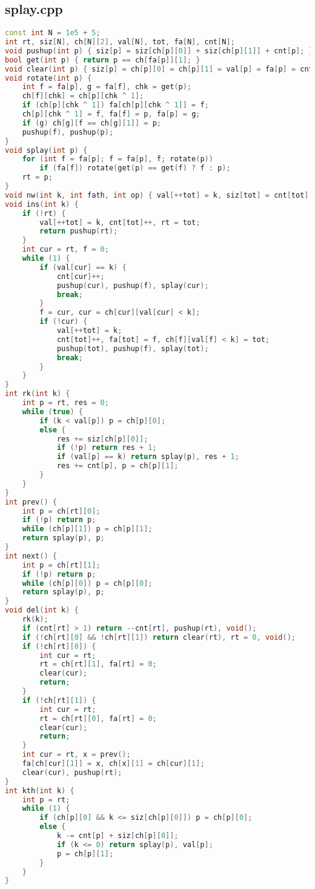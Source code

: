 \documentclass[9pt, a4paper, oneside]{book}
\begin{document}
\subsection{splay.cpp}
\begin{lstlisting}[language={C++}]
const int N = 1e5 + 5;
int rt, siz[N], ch[N][2], val[N], tot, fa[N], cnt[N];
void pushup(int p) { siz[p] = siz[ch[p][0]] + siz[ch[p][1]] + cnt[p]; }
bool get(int p) { return p == ch[fa[p]][1]; }
void clear(int p) { siz[p] = ch[p][0] = ch[p][1] = val[p] = fa[p] = cnt[p] = 0; }
void rotate(int p) {
    int f = fa[p], g = fa[f], chk = get(p);
    ch[f][chk] = ch[p][chk ^ 1];
    if (ch[p][chk ^ 1]) fa[ch[p][chk ^ 1]] = f;
    ch[p][chk ^ 1] = f, fa[f] = p, fa[p] = g;
    if (g) ch[g][f == ch[g][1]] = p;
    pushup(f), pushup(p);
}
void splay(int p) {
    for (int f = fa[p]; f = fa[p], f; rotate(p))
        if (fa[f]) rotate(get(p) == get(f) ? f : p);
    rt = p;
}
void nw(int k, int fath, int op) { val[++tot] = k, siz[tot] = cnt[tot] = 1, fa[tot] = fath, ch[fath][op] = tot; }
void ins(int k) {
    if (!rt) {
        val[++tot] = k, cnt[tot]++, rt = tot;
        return pushup(rt);
    }
    int cur = rt, f = 0;
    while (1) {
        if (val[cur] == k) {
            cnt[cur]++;
            pushup(cur), pushup(f), splay(cur);
            break;
        }
        f = cur, cur = ch[cur][val[cur] < k];
        if (!cur) {
            val[++tot] = k;
            cnt[tot]++, fa[tot] = f, ch[f][val[f] < k] = tot;
            pushup(tot), pushup(f), splay(tot);
            break;
        }
    }
}
int rk(int k) {
    int p = rt, res = 0;
    while (true) {
        if (k < val[p]) p = ch[p][0];
        else {
            res += siz[ch[p][0]];
            if (!p) return res + 1;
            if (val[p] == k) return splay(p), res + 1;
            res += cnt[p], p = ch[p][1];
        }
    }
}
int prev() {
    int p = ch[rt][0];
    if (!p) return p;
    while (ch[p][1]) p = ch[p][1];
    return splay(p), p;
}
int next() {
    int p = ch[rt][1];
    if (!p) return p;
    while (ch[p][0]) p = ch[p][0];
    return splay(p), p;
}
void del(int k) {
    rk(k);
    if (cnt[rt] > 1) return --cnt[rt], pushup(rt), void();
    if (!ch[rt][0] && !ch[rt][1]) return clear(rt), rt = 0, void();
    if (!ch[rt][0]) {
        int cur = rt;
        rt = ch[rt][1], fa[rt] = 0;
        clear(cur);
        return;
    }
    if (!ch[rt][1]) {
        int cur = rt;
        rt = ch[rt][0], fa[rt] = 0;
        clear(cur);
        return;
    }
    int cur = rt, x = prev();
    fa[ch[cur][1]] = x, ch[x][1] = ch[cur][1];
    clear(cur), pushup(rt);
}
int kth(int k) {
    int p = rt;
    while (1) {
        if (ch[p][0] && k <= siz[ch[p][0]]) p = ch[p][0];
        else {
            k -= cnt[p] + siz[ch[p][0]];
            if (k <= 0) return splay(p), val[p];
            p = ch[p][1];
        }
    }
}\end{lstlisting}
\end{document}
